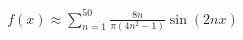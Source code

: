 \documentclass[preview]{standalone}
\begin{document}
\begin{align*}
f(x) \approx \sum_{n=1}^{50} \frac{8n}{\pi(4n^2-1)} \sin(2nx)
\end{align*}
\end{document}
